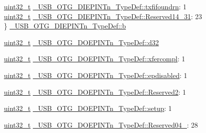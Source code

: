 \begin{DoxyCompactItemize}
\begin{tabbing}
\>\hyperlink{stdint_8h_a435d1572bf3f880d55459d9805097f62}{uint32\_t} \hyperlink{group___u_s_b___o_t_g___d_r_i_v_e_r_ga158dce0a9dd3a9f996d4f1dc5e498c07}{\_USB\_OTG\_DIEPINTn\_TypeDef::txfifoundrn}: 1\\
\>\hyperlink{stdint_8h_a435d1572bf3f880d55459d9805097f62}{uint32\_t} \hyperlink{group___u_s_b___o_t_g___d_r_i_v_e_r_gaa80385fefe8695d6ae753cfceb278786}{\_USB\_OTG\_DIEPINTn\_TypeDef::Reserved14\_31}: 23\\
\} \hyperlink{group___u_s_b___o_t_g___d_r_i_v_e_r_ga4bc8be4b067f5eff9cf4101acef38798}{\_USB\_OTG\_DIEPINTn\_TypeDef::b}\\

\end{tabbing}\item 
\hyperlink{stdint_8h_a435d1572bf3f880d55459d9805097f62}{uint32\-\_\-t} \hyperlink{group___u_s_b___o_t_g___d_r_i_v_e_r_ga6a2af3648bfb97391f2a267df8bd3204}{\-\_\-\-U\-S\-B\-\_\-\-O\-T\-G\-\_\-\-D\-O\-E\-P\-I\-N\-Tn\-\_\-\-Type\-Def\-::d32}
\item 
\hyperlink{stdint_8h_a435d1572bf3f880d55459d9805097f62}{uint32\-\_\-t} \hyperlink{group___u_s_b___o_t_g___d_r_i_v_e_r_gaaca4cf95c7b4adf7ca9ec0895ba5360d}{\-\_\-\-U\-S\-B\-\_\-\-O\-T\-G\-\_\-\-D\-O\-E\-P\-I\-N\-Tn\-\_\-\-Type\-Def\-::xfercompl}\-: 1
\item 
\hyperlink{stdint_8h_a435d1572bf3f880d55459d9805097f62}{uint32\-\_\-t} \hyperlink{group___u_s_b___o_t_g___d_r_i_v_e_r_ga8fa33d9d00b0398bb9cffbeef8ed78a9}{\-\_\-\-U\-S\-B\-\_\-\-O\-T\-G\-\_\-\-D\-O\-E\-P\-I\-N\-Tn\-\_\-\-Type\-Def\-::epdisabled}\-: 1
\item 
\hyperlink{stdint_8h_a435d1572bf3f880d55459d9805097f62}{uint32\-\_\-t} \hyperlink{group___u_s_b___o_t_g___d_r_i_v_e_r_ga9032caa3217578a7f7660b1b5489fea7}{\-\_\-\-U\-S\-B\-\_\-\-O\-T\-G\-\_\-\-D\-O\-E\-P\-I\-N\-Tn\-\_\-\-Type\-Def\-::\-Reserved2}\-: 1
\item 
\hyperlink{stdint_8h_a435d1572bf3f880d55459d9805097f62}{uint32\-\_\-t} \hyperlink{group___u_s_b___o_t_g___d_r_i_v_e_r_ga1fcadb3c98fdf26e6e29a2ee7611ee01}{\-\_\-\-U\-S\-B\-\_\-\-O\-T\-G\-\_\-\-D\-O\-E\-P\-I\-N\-Tn\-\_\-\-Type\-Def\-::setup}\-: 1
\item 
\hyperlink{stdint_8h_a435d1572bf3f880d55459d9805097f62}{uint32\-\_\-t} \hyperlink{group___u_s_b___o_t_g___d_r_i_v_e_r_gaf42d3169ce0fb063fbccbbc7ad0efd57}{\-\_\-\-U\-S\-B\-\_\-\-O\-T\-G\-\_\-\-D\-O\-E\-P\-I\-N\-Tn\-\_\-\-Type\-Def\-::\-Reserved04\-\_}\-: 28
\item 
\begin{tabbing}

\end{tabbing}
\end{DoxyCompactItemize}

